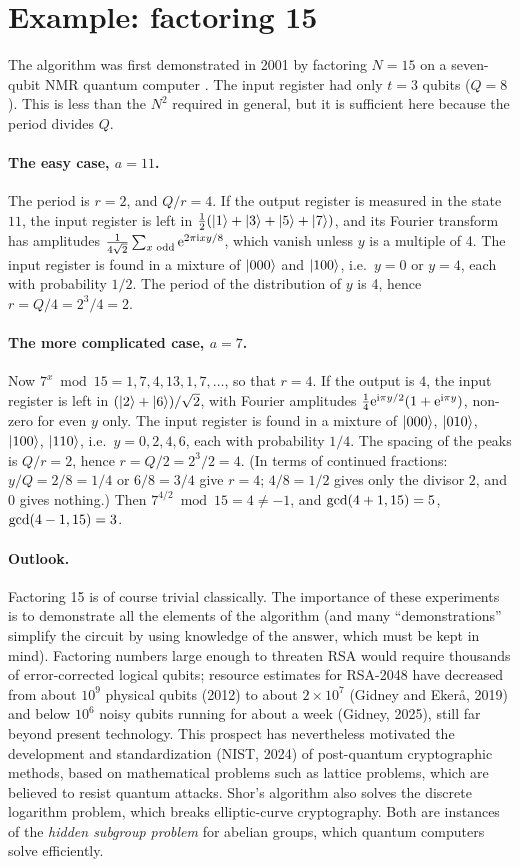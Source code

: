 \section{Example: factoring 15}
The algorithm was first demonstrated in 2001 by factoring $N=15$ on a seven-qubit NMR quantum computer \cite{Vandersypen2001}. The input register had only $t=3$ qubits ($Q=8$). This is less than the $N^2$
required in general, but it is sufficient here because the period divides $Q$.

\paragraph{The easy case, $a=11$.} The period is $r=2$, and $Q/r=4$. If the output register is measured in the state $11$, the input register is left in $\frac12(\left|1\right\rangle+\left|3\right\rangle+\left|5\right\rangle+\left|7\right\rangle)$, and its Fourier transform
has amplitudes $\frac1{4\sqrt2}\sum_{x\text{ odd}}\mathrm e^{2\pi\mathrm i xy/8}$, which vanish unless $y$ is a multiple of 4. The input register is found in a mixture of $\left|000\right\rangle$ and $\left|100\right\rangle$, i.e.\ $y=0$ or $y=4$, each
with probability $1/2$. The period of the distribution of $y$ is 4, hence $r=Q/4=2^3/4=2$.

\paragraph{The more complicated case, $a=7$.} Now $7^x\bmod15=1,7,4,13,1,7,\dots$, so that $r=4$. If the output is $4$, the input register is left in $(\left|2\right\rangle+\left|6\right\rangle)/\sqrt2$, with Fourier amplitudes
$\frac14\mathrm e^{\mathrm i\pi y/2}(1+\mathrm e^{\mathrm i\pi y})$, non-zero for even $y$ only. The input register is found in a mixture of $\left|000\right\rangle$, $\left|010\right\rangle$, $\left|100\right\rangle$, $\left|110\right\rangle$, i.e.\ $y=0,2,4,6$, each with probability $1/4$.
The spacing of the peaks is $Q/r=2$, hence $r=Q/2=2^3/2=4$. (In terms of continued fractions: $y/Q=2/8=1/4$ or $6/8=3/4$ give $r=4$; $4/8=1/2$ gives only the divisor $2$, and $0$ gives nothing.) Then
$7^{4/2}\bmod15=4\neq-1$, and $\operatorname{gcd}(4+1,15)=5$, $\operatorname{gcd}(4-1,15)=3$.

\paragraph{Outlook.} Factoring 15 is of course trivial classically. The importance of these experiments is to demonstrate all the elements of the algorithm (and many ``demonstrations'' simplify the circuit by using
knowledge of the answer, which must be kept in mind). Factoring numbers large enough to threaten RSA would require thousands of error-corrected logical qubits; resource estimates for RSA-2048 have decreased from
about $10^9$ physical qubits (2012) to about $2\times10^7$ (Gidney and Ekerå, 2019) and below $10^6$ noisy qubits running for about a week (Gidney, 2025), still far beyond present technology. This prospect has
nevertheless motivated the development and standardization (NIST, 2024) of post-quantum cryptographic methods, based on mathematical problems such as lattice problems, which are believed to resist quantum attacks.
Shor's algorithm also solves the discrete logarithm problem, which breaks elliptic-curve cryptography. Both are instances of the \emph{hidden subgroup problem} for abelian groups, which quantum computers solve efficiently.

